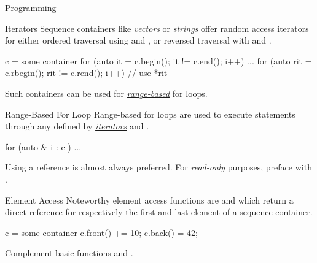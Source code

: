 \documentclass{cognito}
\begin{document}
\lstset{language=C}
\lstset{mathescape=true}


\begin{note}{Programming}
\end{note}

\begin{note}{Iterators}
	Sequence containers like {\it vectors} or {\it strings} offer random access iterators for
	either ordered traversal using  and ,
	or reversed traversal with  and .
	
	\begin{largecode}
 c = some container
 for (auto it = c.begin(); it != c.end(); i++) ...
 for (auto rit = c.rbegin(); rit != c.rend(); i++)
 	// use *rit
	\end{largecode}
	\begin{remark}
		Such containers can be used for \hyperref[note:Range-Based For Loop]{\it range-based} for loops.
	\end{remark}
	\vspace{-5pt}
\end{note}

\begin{note}{Range-Based For Loop}
	Range-based for loops are used to execute statements through any 
	defined by \hyperref[note:Iterators]{\it iterators}  and .
	
	\begin{largecode}
 for (auto & i : c ) ...
	\end{largecode}
	\begin{remark} Using a reference \incode{\&} is almost always preferred.
		For {\it read-only} purposes, preface with .
	\end{remark}\vspace{-5pt}
\end{note}


\begin{note}{Element Access}
	Noteworthy element access functions are  and 
	which return a direct reference for respectively the first and last element of a sequence
	container.
	
	\begin{largecode}
 c = some container
 c.front() += 10;
 c.back() = 42;
	\end{largecode}
	\begin{remark} Complement basic functions  and . \end{remark}
	\vspace{-5pt}
\end{note} 
\end{document}
